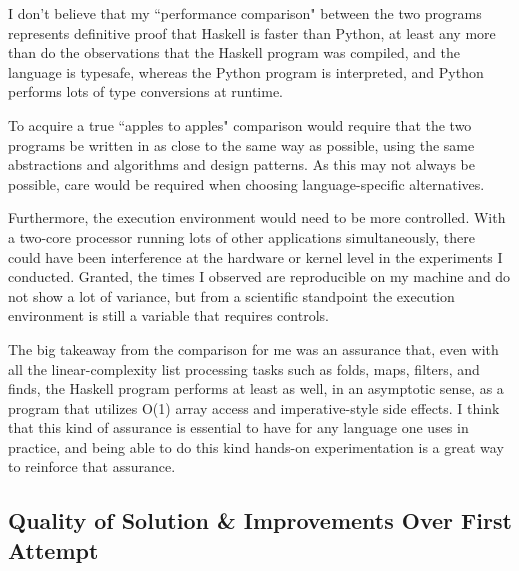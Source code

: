 \documentclass[12pt,a4paper]{article}
\begin{document}
		\par I don't believe that my ``performance comparison" between the two programs represents definitive proof that Haskell is faster than Python, at least any more than do the observations that the Haskell program was compiled, and the language is typesafe, whereas the Python program is interpreted, and Python performs lots of type conversions at runtime. 
		\par To acquire a true ``apples to apples" comparison would require that the two programs be written in as close to the same way as possible, using the same abstractions and algorithms and design patterns. As this may not always be possible, care would be required when choosing language-specific alternatives. 
		\par Furthermore, the execution environment would need to be more controlled. With a two-core processor running lots of other applications simultaneously, there could have been interference at the hardware or kernel level in the experiments I conducted. Granted, the times I observed are reproducible on my machine and do not show a lot of variance, but from a scientific standpoint the execution environment is still a variable that requires controls. 
		\par The big takeaway from the comparison for me was an assurance that, even with all the linear-complexity list processing tasks such as folds, maps, filters, and finds, the Haskell program performs at least as well, in an asymptotic sense, as a program that utilizes O(1) array access and imperative-style side effects. I think that this kind of assurance is essential to have for any language one uses in practice, and being able to do this kind hands-on experimentation is a great way to reinforce that assurance.
		
		\subsection{Quality of Solution \& Improvements Over First Attempt}
		
\end{document}
